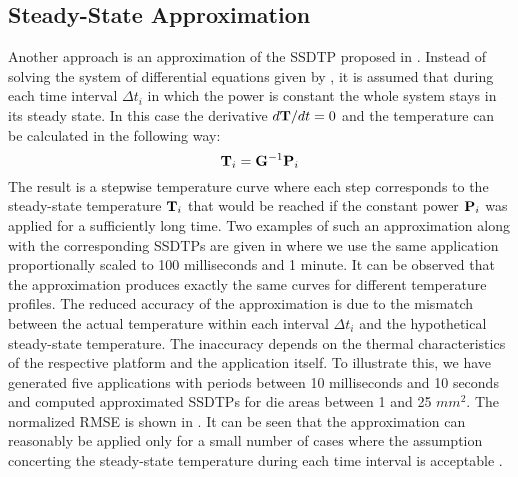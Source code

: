 \subsection{Steady-State Approximation} \label{sec:steady-state-approximation}
Another approach is an approximation of the SSDTP proposed in \cite{huang2009}. Instead of solving the system of differential equations given by , it is assumed that during each time interval $\Delta t_i$ in which the power is constant the whole system stays in its steady state. In this case the derivative \mbox{$d\mathbf{T}/dt = 0$} and the temperature can be calculated in the following way:
\[
  \mathbf{T}_i = \mathbf{G}^{-1} \mathbf{P}_i
\]
The result is a stepwise temperature curve where each step corresponds to the steady-state temperature $\mathbf{T}_i$ that would be reached if the constant power $\mathbf{P}_i$ was applied for a sufficiently long time. Two examples of such an approximation along with the corresponding SSDTPs are given in  where we use the same application proportionally scaled to 100 milliseconds and 1 minute. It can be observed that the approximation produces exactly the same curves for different temperature profiles. The reduced accuracy of the approximation is due to the mismatch between the actual temperature within each interval $\Delta t_i$ and the hypothetical steady-state temperature. The inaccuracy depends on the thermal characteristics of the respective platform and the application itself. To illustrate this, we have generated five applications with periods between 10 milliseconds and 10 seconds and computed approximated SSDTPs for die areas between 1 and 25 $mm^2$. The normalized RMSE is shown in . It can be seen that the approximation can reasonably be applied only for a small number of cases where the assumption concerting the steady-state temperature during each time interval is acceptable \cite{huang2009}.
